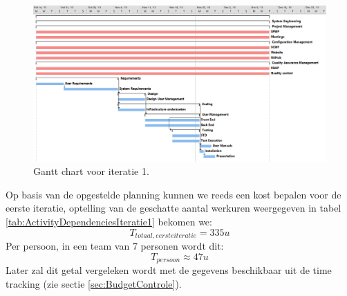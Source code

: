 \begin{landscape}
	\begin{figure} [H]
		\centering
		\includegraphics[width = 1.35\textwidth]{ManagerialProcess/GanttChartIT1.png}	
		\caption{Gantt chart voor iteratie 1.}
		\label{fig:GantChartIT1}
	\end{figure}
\end{landscape}
Op basis van de opgestelde planning kunnen we reeds een kost bepalen voor de eerste iteratie, optelling van de geschatte aantal werkuren weergegeven in tabel \ref{tab:ActivityDependenciesIteratie1} bekomen we:
\begin{equation*}
	T_{totaal, eerste iteratie} = 335u
\end{equation*} 
Per persoon, in een team van 7 personen wordt dit:
\begin{equation*}
	T_{persoon} \approx 47u
\end{equation*}
Later zal dit getal vergeleken wordt met de gegevens beschikbaar uit de time tracking (zie sectie \ref{sec:BudgetControle}).

